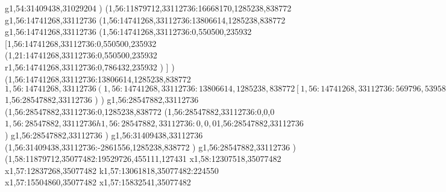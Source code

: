 {g1,54:31409438,31029204
)
(1,56:11879712,33112736:16668170,1285238,838772
g1,56:14741268,33112736
(1,56:14741268,33112736:13806614,1285238,838772
g1,56:14741268,33112736
(1,56:14741268,33112736:0,550500,235932
[1,56:14741268,33112736:0,550500,235932
(1,21:14741268,33112736:0,550500,235932
r1,56:14741268,33112736:0,786432,235932
)
]
)
(1,56:14741268,33112736:13806614,1285238,838772
$1,56:14741268,33112736
(1,56:14741268,33112736:13806614,1285238,838772
[1,56:14741268,33112736:569796,539580,0
(1,56:14862326,32945254:0,372098,0
x1,56:15190007,32945254
)
(1,56:14741268,33112736:569796,449650,0
x1,56:15311064,33112736
)
]
x1,56:16057448,33112736
g1,56:16239488,33112736
x1,56:16931259,33112736
g1,56:17113299,33112736
(1,56:17113299,32220711:364090,0,1456371
x1,56:17477389,32220711
)
[1,56:17477389,33709849:522013,1609289,0
(1,56:17768660,32382729:230742,282169,0
x1,56:17966634,32382729
)
(1,56:17477389,33709849:294003,295640,0
x1,56:17738624,33709849
)
]
g1,56:18108626,33112736
x1,56:19424806,33112736
g1,56:19606846,33112736
x1,56:20116572,33112736
g1,56:20298612,33112736
[1,56:20298612,33112736:1602378,1285238,838772
(1,56:20298612,32237098:1602378,344064,114688
x1,56:21900990,32237098
)
(1,56:20298612,33112736:1602378,688132,360452
k1,56:20626485,33112736:327873
(1,56:20626485,32490140:946633,65536,983048
x1,56:21573118,32490140
)
k1,56:21900990,33112736:327872
)
(1,56:20298612,33885972:1602378,303558,0
k1,56:20675314,33885972:376702
x1,56:21524289,33885972
k1,56:21900990,33885972:376701
)
]
g1,56:22010214,33112736
x1,56:22276227,33112736
(1,56:22276227,33211039:218188,303558,0
x1,56:22461647,33211039
)
x1,56:23064211,33112736
(1,56:23064211,33211039:218188,303558,0
x1,56:23249631,33211039
)
g1,56:23428031,33112736
x1,56:23937757,33112736
g1,56:24083389,33112736
x1,56:24574910,33112736
g1,56:24720542,33112736
x1,56:25230268,33112736
g1,56:25375900,33112736
x1,56:25612558,33112736
(1,56:25612558,33231066:964310,344064,114688
x1,56:26544100,33231066
)
x1,56:27401527,33112736
(1,56:27401527,33231066:964310,344064,114688
x1,56:28333069,33231066
)
x1,56:28547882,33112736
)
$1,56:28547882,33112736
)
)
g1,56:28547882,33112736
(1,56:28547882,33112736:0,1285238,838772
(1,56:28547882,33112736:0,0,0
$1,56:28547882,33112736
h1,56:28547882,33112736:0,0,0
$1,56:28547882,33112736
)
g1,56:28547882,33112736
)
g1,56:31409438,33112736
(1,56:31409438,33112736:-2861556,1285238,838772
)
g1,56:28547882,33112736
)
(1,58:11879712,35077482:19529726,455111,127431
x1,58:12307518,35077482
x1,57:12837268,35077482
k1,57:13061818,35077482:224550
x1,57:15504860,35077482
x1,57:15832541,35077482
}
